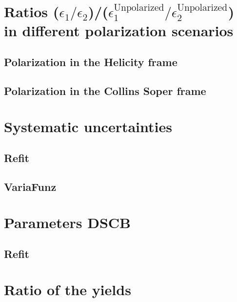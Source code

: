 \documentclass[a4paper,12pt]{article}
\begin{document}
\section*{Ratios
  ($\epsilon_1/\epsilon_2$)/($\epsilon_1^{\mbox{Unpolarized}}/\epsilon_2^{\mbox{Unpolarized}}$)
  in different polarization scenarios}

\vspace{2 em}


\subsection*{Polarization in the Helicity frame}
{\footnotesize

}
\vspace{3 em}

\subsection*{Polarization in the Collins Soper frame}
{\footnotesize

}
\section*{Systematic uncertainties}

\subsection*{Refit}


\subsection*{VariaFunz}



\section*{Parameters DSCB}

\subsection*{Refit}


% 

\section*{Ratio of the yields}
\end{document}
